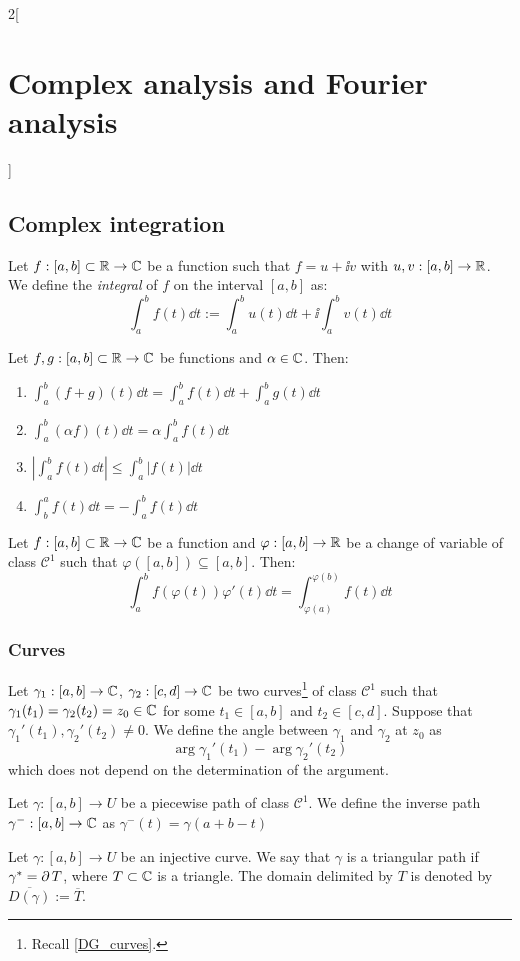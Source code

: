 \documentclass[../../../main.tex]{subfiles}
\begin{document}
\begin{multicols}{2}[\section{Complex analysis and Fourier analysis}]
  \subsection{Complex integration}
  \begin{definition}
    Let $f:[a,b]\subset\mathbb{R}\rightarrow\mathbb{C}$ be a function such that $f=u+\ii v$ with $u,v:[a,b]\rightarrow\mathbb{R}$. We define the \emph{integral} of $f$ on the interval $[a,b]$ as: $$\int_a^bf(t)\dd{t}:=\int_a^bu(t)\dd{t}+\ii\int_a^bv(t)\dd{t}$$
  \end{definition}
  \begin{proposition}
    Let $f,g:[a,b]\subset\mathbb{R}\rightarrow\mathbb{C}$ be functions and $\alpha\in\mathbb{C}$. Then:
    \begin{enumerate}
      \item $\displaystyle\int_a^b(f+g)(t)\dd{t}=\int_a^bf(t)\dd{t}+\int_a^bg(t)\dd{t}$
      \item $\displaystyle\int_a^b(\alpha f)(t)\dd{t}=\alpha \int_a^bf(t)\dd{t}$
      \item $\displaystyle\left|\int_a^bf(t)\dd{t}\right|\leq\int_a^b|f(t)|\dd{t}$
      \item $\displaystyle \int_b^af(t)\dd{t}=-\int_a^bf(t)\dd{t}$
    \end{enumerate}
  \end{proposition}
  \begin{proposition}
    Let $f:[a,b]\subset\mathbb{R}\rightarrow\mathbb{C}$ be a function and $\varphi:[a,b]\rightarrow\mathbb{R}$ be a change of variable of class $\mathcal{C}^1$ such that $\varphi([a,b])\subseteq[a,b]$. Then: $$\int_a^bf(\varphi(t))\varphi'(t)\dd{t}=\int_{\varphi(a)}^{\varphi(b)}f(t)\dd{t}$$
  \end{proposition}
  \subsubsection{Curves}
  \begin{definition}
    Let $\gamma_1:[a,b]\rightarrow\mathbb{C}$, $\gamma_2:[c,d]\rightarrow\mathbb{C}$ be two curves\footnote{Recall \cref{DG_curves}.} of class $\mathcal{C}^1$ such that $\gamma_1(t_1)=\gamma_2(t_2)=z_0\in\mathbb{C}$ for some $t_1\in[a,b]$ and $t_2\in[c,d]$. Suppose that ${\gamma_1}'(t_1),{\gamma_2}'(t_2)\ne 0$. We define the angle between $\gamma_1$ and $\gamma_2$ at $z_0$ as $$\arg{\gamma_1}'(t_1)-\arg{\gamma_2}'(t_2)$$ which does not depend on the determination of the argument.
  \end{definition}
  \begin{definition}
    Let $\gamma:[a,b]\rightarrow U$ be a piecewise path of class $\mathcal{C}^1$. We define the inverse path $\gamma^-:[a,b]\rightarrow\mathbb{C}$ as $\gamma^-(t)=\gamma(a+b-t)$
  \end{definition}
  \begin{definition}
    Let $\gamma:[a,b]\rightarrow U$ be an injective curve. We say that $\gamma$ is a triangular path if $\gamma^*=\operatorname{\partial} T$, where $T\subset\mathbb{C}$ is a triangle. The domain delimited by $T$ is denoted by $\overline{D(\gamma)}:=\overline{T}$.
  \end{definition}

\end{multicols}
\end{document}
